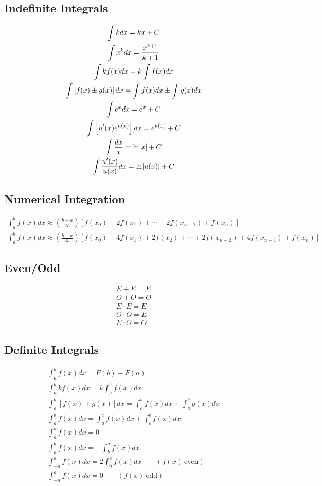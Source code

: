 \documentclass[letterpaper,12pt,fleqn]{article}
\begin{document}
\subsection*{Indefinite Integrals}

\begin{gather*}
  \int kdx=kx+C \\
  \int x^kdx=\frac{x^{k+1}}{k+1} \\
  \int kf(x)dx=k\int f(x)dx \\
  \int\left[f(x)\pm g(x)\right]dx=\int f(x)dx\pm\int g(x)dx \\
  \int e^xdx=e^x+C \\
  \int\left[u'(x)e^{u(x)}\right]dx=e^{u(x)}+C \\
  \int\frac{dx}{x}=\ln\lvert x\rvert+C \\
  \int\frac{u'(x)}{u(x)}dx=\ln\lvert u(x)\rvert+C
\end{gather*}

\subsection*{Numerical Integration}

\begin{gather*}
  \int_a^b f(x)dx\approx\left(\frac{b-a}{2n}\right)\left[f(x_0)+2f(x_1)+\cdots+2f(x_{n-1})+f(x_n)\right] \\
  \int_a^b f(x)dx\approx\left(\frac{b-a}{3n}\right)
  \left[f(x_0)+4f(x_1)+2f(x_2)+\cdots+2f(x_{n-2})+4f(x_{n-1})+f(x_n)\right]
\end{gather*}

\subsection*{Even/Odd}

\begin{gather*}
  E+E=E \\
  O+O=O \\
  E\cdot E=E \\
  O\cdot O=E \\
  E\cdot O=O
\end{gather*}

\subsection*{Definite Integrals}

\begin{gather*}
  \int_a^bf(x)dx=F(b)-F(a) \\
  \int_a^b kf(x)dx=k\int_a^b f(x)dx \\
  \int_a^b\left[f(x)\pm g(x)\right]dx=\int_a^b f(x)dx\pm\int_a^b g(x)dx \\
  \int_a^b f(x)dx=\int_a^c f(x)dx+\int_c^b f(x)dx \\
  \int_a^a f(x)dx = 0 \\
  \int_a^b f(x)dx = -\int_b^a f(x)dx \\
  \int_{-a}^af(x)dx=2\int_0^a f(x)dx\qquad(f(x)\ \text{even}) \\
  \int_{-a}^af(x)dx=0\qquad(f(x)\ \text{odd}) \\
\end{gather*}
\end{document}
